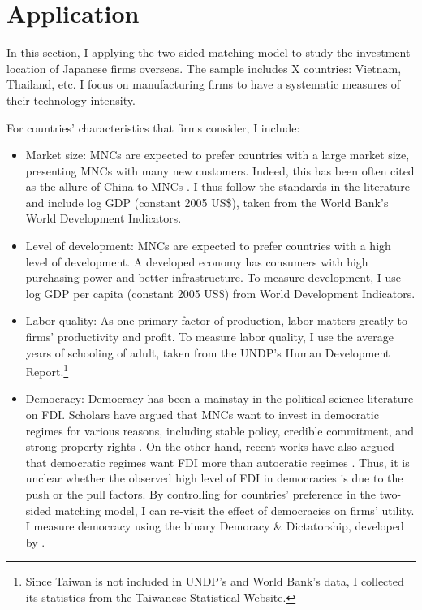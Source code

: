 \section{Application}
\label{sec:application}

In this section, I applying the two-sided matching model to study the investment location of Japanese firms overseas. The sample includes X countries: Vietnam, Thailand, etc. I focus on manufacturing firms to have a systematic measures of their technology intensity.

For countries' characteristics that firms consider, I include:

\begin{itemize}
\item Market size: MNCs are expected to prefer countries with a large market size, presenting MNCs with many new customers. Indeed, this has been often cited as the allure of China to MNCs \citep{Luo2010}. I thus follow the standards in the literature and include log GDP (constant 2005 US\$), taken from the World Bank's World Development Indicators.

\item Level of development: MNCs are expected to prefer countries with a high level of development. A developed economy has consumers with high purchasing power and better infrastructure. To measure development, I use log GDP per capita (constant 2005 US\$) from World Development Indicators.

\item Labor quality: As one primary factor of production, labor matters greatly to firms' productivity and profit. To measure labor quality, I use the average years of schooling of adult, taken from the UNDP's Human Development Report.\footnote{Since Taiwan is not included in UNDP's and World Bank's data, I collected its statistics from the Taiwanese Statistical Website.}

\item Democracy: Democracy has been a mainstay in the political science literature on FDI. Scholars have argued that MNCs want to invest in democratic regimes for various reasons, including stable policy, credible commitment, and strong property rights \citep{Ahlquist2006, Li2003, Jensen2003}. On the other hand, recent works have also argued that democratic regimes want FDI more than autocratic regimes \citep{Pandya2016}. Thus, it is unclear whether the observed high level of FDI in democracies is due to the push or the pull factors. By controlling for countries' preference in the two-sided matching model, I can re-visit the effect of democracies on firms' utility. I measure democracy using the binary Demoracy \& Dictatorship, developed by \citet{Cheibub2009b}.
\end{itemize}

